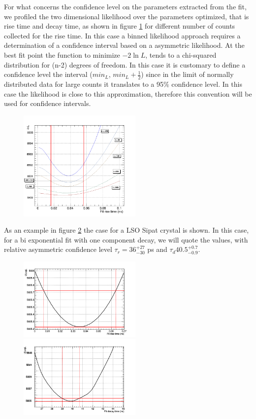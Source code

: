 For what concerns the confidence level on the parameters extracted from the fit, we profiled the two dimensional likelihood over the parameters optimized, that is rise time and decay time, as shown in figure \ref{fig:likelihood} for different number of counts collected for the rise time.
In this case a binned likelihood approach requires a determination of a confidence interval based on a asymmetric likelihood.
At the best fit point the function to minimize  $-2\ln{L}$, tends to a chi-squared distribution for (n-2) degrees of freedom. In this case it is customary to define a confidence level the interval ($min_{L}$, $min_{L}+\frac{1}{2}$) since in the limit of normally distributed data for large counts it translates to a 95$\%$ confidence level. In this case the likelihood is close to this approximation, therefore this convention will be used for confidence intervals.
\begin{figure}[htbp]
\begin{center}
\includegraphics[width=6cm]{../Pictures/Chapter_7/error_rise.png}
\end{center}
\caption[]{}
\label{fig:likelihood}
\end{figure}

As an example in figure \ref{fig:likelihood_sipat} the case for a LSO Sipat crystal is shown. In this case, for a bi exponential fit with one component decay, we will quote the values, with relative asymmetric confidence level $\tau _{r} = 36_{-30}^{+27}$ ps and $\tau _{d}40.5_{-0.9}^{+0.7}$.
\begin{figure}[htbp]
\begin{center}
\includegraphics[width=6cm]{../Pictures/Chapter_7/rise_sipat.png}
\includegraphics[width=6cm]{../Pictures/Chapter_7/decay_like_2.png}
\end{center}
\caption[]{}
\label{fig:likelihood_sipat}
\end{figure}

